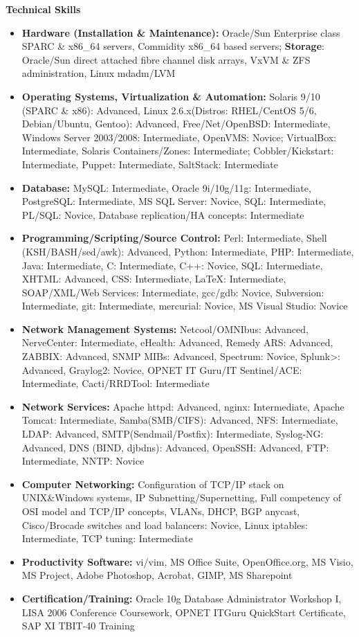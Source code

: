 \documentclass[10pt,oneside]{article}
\newenvironment{ressection}[1]{
	\vspace{4pt}
	\textbf{\selectfont\normalsize#1}
	\begin{itemize}
	\vspace{3pt}
}{
	\end{itemize}
}
\newcommand{\resitem}[1]{
	\vspace{-4pt}
	\item \begin{flushleft} #1 \end{flushleft}
}
\begin{document}
\begin{ressection}{Technical Skills}

	\resitem{\textbf{Hardware (Installation \& Maintenance):} Oracle/Sun Enterprise class SPARC \& x86\_64 servers, Commidity x86\_64 based servers; \textbf{Storage}: Oracle/Sun direct attached fibre channel disk arrays, VxVM \& ZFS administration, Linux mdadm/LVM}

	\resitem{\textbf{Operating Systems, Virtualization \& Automation:} Solaris 9/10 (SPARC \& x86): Advanced, Linux 2.6.x(Distros: RHEL/CentOS 5/6, Debian/Ubuntu, Gentoo): Advanced, Free/Net/OpenBSD: Intermediate, Windows Server 2003/2008: Intermediate, OpenVMS: Novice; VirtualBox: Intermediate, Solaris Containers/Zones: Intermediate; Cobbler/Kickstart: Intermediate, Puppet: Intermediate, SaltStack: Intermediate}

	\resitem{\textbf{Database:} MySQL: Intermediate, Oracle 9i/10g/11g: Intermediate, PostgreSQL: Intermediate, MS SQL Server: Novice, SQL: Intermediate, PL/SQL: Novice, Database replication/HA concepts: Intermediate}

	\resitem{\textbf{Programming/Scripting/Source Control:} Perl: Intermediate, Shell (KSH/BASH/sed/awk): Advanced, Python: Intermediate, PHP: Intermediate, Java: Intermediate, C: Intermediate, C++: Novice, SQL: Intermediate, XHTML: Advanced, CSS: Intermediate,  \LaTeX: Intermediate,  SOAP/XML/Web Services: Intermediate, gcc/gdb: Novice, Subversion: Intermediate, git: Intermediate, mercurial: Novice, MS Visual Studio: Novice}

	\resitem{\textbf{Network Management Systems:} Netcool/OMNIbus: Advanced, NerveCenter: Intermediate, eHealth: Advanced, Remedy ARS: Advanced, ZABBIX: Advanced, SNMP MIBs: Advanced, Spectrum: Novice, Splunk>: Advanced, Graylog2: Novice, OPNET IT Guru/IT Sentinel/ACE: Intermediate, Cacti/RRDTool: Intermediate}

	\resitem{\textbf{Network Services:} Apache httpd: Advanced, nginx: Intermediate, Apache Tomcat: Intermediate, Samba(SMB/CIFS): Advanced, NFS: Intermediate, LDAP: Advanced, SMTP(Sendmail/Postfix): Intermediate, Syslog-NG: Advanced, DNS (BIND, djbdns): Advanced, OpenSSH: Advanced, FTP: Intermediate, NNTP: Novice}

	\resitem{\textbf{Computer Networking:} Configuration of TCP/IP stack on UNIX\&Windows systems, IP Subnetting/Supernetting, Full competency of OSI model and TCP/IP concepts, VLANs, DHCP, BGP anycast, Cisco/Brocade switches and load balancers: Novice, Linux iptables: Intermediate, TCP tuning: Intermediate}

	\resitem{\textbf{Productivity Software:} vi/vim, MS Office Suite, OpenOffice.org, MS Visio, MS Project, Adobe Photoshop, Acrobat, GIMP, MS Sharepoint}

	\resitem{\textbf{Certification/Training:} Oracle 10g Database Administrator Workshop I, LISA 2006 Conference Coursework, OPNET ITGuru QuickStart Certificate, SAP XI TBIT-40 Training}
	
\end{ressection}
\end{document}

